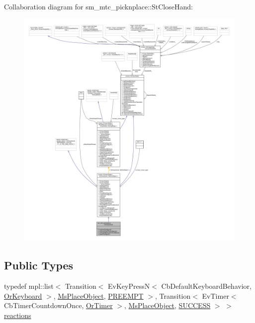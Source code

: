 Collaboration diagram for sm\+\_\+mtc\+\_\+picknplace\+:\+:St\+Close\+Hand\+:
\nopagebreak
\begin{figure}[H]
\begin{center}
\leavevmode
\includegraphics[width=350pt]{structsm__mtc__picknplace_1_1StCloseHand__coll__graph}
\end{center}
\end{figure}
\subsection*{Public Types}
\begin{DoxyCompactItemize}
\item 
typedef mpl\+::list$<$ Transition$<$ Ev\+Key\+PressN$<$ Cb\+Default\+Keyboard\+Behavior, \hyperlink{classsm__mtc__picknplace_1_1OrKeyboard}{Or\+Keyboard} $>$, \hyperlink{classsm__mtc__picknplace_1_1MsPlaceObject}{Ms\+Place\+Object}, \hyperlink{classPREEMPT}{P\+R\+E\+E\+M\+PT} $>$, Transition$<$ Ev\+Timer$<$ Cb\+Timer\+Countdown\+Once, \hyperlink{classsm__mtc__picknplace_1_1OrTimer}{Or\+Timer} $>$, \hyperlink{classsm__mtc__picknplace_1_1MsPlaceObject}{Ms\+Place\+Object}, \hyperlink{classSUCCESS}{S\+U\+C\+C\+E\+SS} $>$ $>$ \hyperlink{structsm__mtc__picknplace_1_1StCloseHand_a741fc0fcb00a098b452255ec9eea56ae}{reactions}
\end{DoxyCompactItemize}
